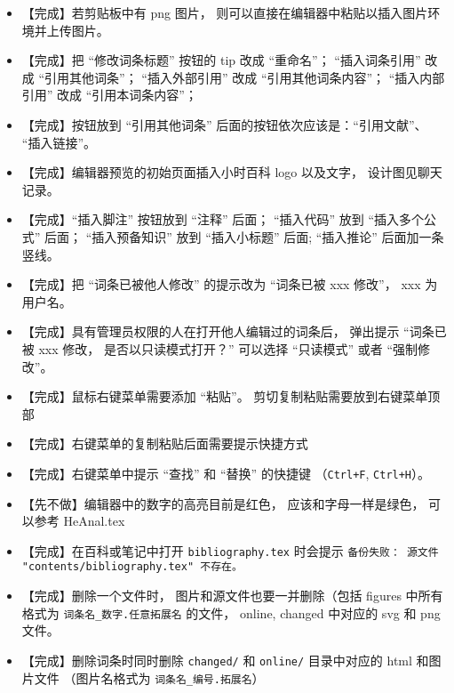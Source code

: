 \begin{itemize}
\item 【完成】若剪贴板中有 png 图片， 则可以直接在编辑器中粘贴以插入图片环境并上传图片。

\item 【完成】把 “修改词条标题” 按钮的 tip 改成 “重命名”； “插入词条引用” 改成 “引用其他词条”； “插入外部引用” 改成 “引用其他词条内容”； “插入内部引用” 改成 “引用本词条内容”；

\item 【完成】按钮放到 “引用其他词条” 后面的按钮依次应该是：“引用文献”、 “插入链接”。

\item 【完成】编辑器预览的初始页面插入小时百科 logo 以及文字， 设计图见聊天记录。

\item 【完成】“插入脚注” 按钮放到 “注释” 后面； “插入代码” 放到 “插入多个公式” 后面； “插入预备知识” 放到 “插入小标题” 后面; “插入推论” 后面加一条竖线。

\item 【完成】把 “词条已被他人修改” 的提示改为 “词条已被 xxx 修改”， xxx 为用户名。

\item 【完成】具有管理员权限的人在打开他人编辑过的词条后， 弹出提示 “词条已被 xxx 修改， 是否以只读模式打开？” 可以选择 “只读模式” 或者 “强制修改”。

\item 【完成】鼠标右键菜单需要添加 “粘贴”。 剪切复制粘贴需要放到右键菜单顶部

\item 【完成】右键菜单的复制粘贴后面需要提示快捷方式

\item 【完成】右键菜单中提示 “查找” 和 “替换” 的快捷键 （\verb|Ctrl+F|, \verb|Ctrl+H|）。

\item 【先不做】编辑器中的数字的高亮目前是红色， 应该和字母一样是绿色， 可以参考 HeAnal.tex

\item 【完成】在百科或笔记中打开 \verb|bibliography.tex| 时会提示 \verb|备份失败： 源文件 "contents/bibliography.tex" 不存在。|

\item 【完成】删除一个文件时， 图片和源文件也要一并删除（包括 figures 中所有格式为 \verb|词条名_数字.任意拓展名| 的文件， online, changed 中对应的 svg 和 png 文件。

\item 【完成】删除词条时同时删除 \verb|changed/| 和 \verb|online/| 目录中对应的 html 和图片文件 （图片名格式为 \verb|词条名_编号.拓展名|）


\end{itemize}
